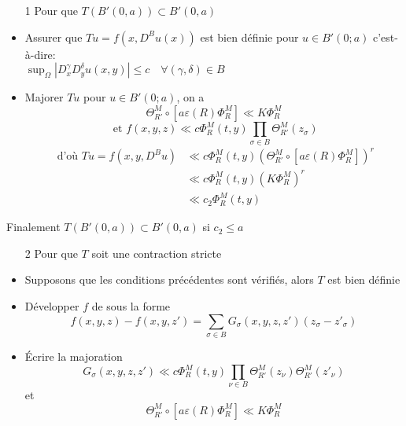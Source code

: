 \documentclass{beamer}
\begin{document}
\begin{frame}
\begin{itemize}
 \item[1] Pour que $T(B'(0,a)) \subset B'(0,a) $
  \end{itemize}

 \begin{itemize}
 \item Assurer que $Tu = f(x, D^B u(x))$ est bien définie pour $u \in B'(0;a)$ c'est-à-dire:\\
 $\sup_\Omega|D^\gamma_xD^\delta_y u(x,y)| \leq c \quad \forall (\gamma, \delta) \in B$
 
 
 \item Majorer $Tu$ pour $u \in B'(0;a)$, on a 
 $$\Theta^M_{R'}\circ[a\varepsilon(R) \Phi^M_R] \ll K \Phi^M_R$$
  $$\text{ et } f(x,y,z) \ll c \Phi^M_R(t,y) \prod_{\sigma \in B} \Theta^M_{R'}(z_\sigma)$$
 \begin{align*}
 \text{ d'où  }Tu=f(x,y,D^Bu) & \ll c \Phi^M_R(t,y) \left( \Theta^M_{R'}\circ[a\varepsilon(R) \Phi^M_R] \right)^r \\
  & \ll c \Phi^M_R(t,y) \left(  K \Phi^M_R \right)^r \\
   & \ll c_2 \Phi^M_R(t,y)
\end{align*}  
 
 \end{itemize}
\end{frame}

\begin{frame}
Finalement $T(B'(0,a)) \subset B'(0,a) $ si $c_2 \leq a$ 
\begin{itemize}
\item[2] Pour que $T$ soit une contraction stricte
\end{itemize}

\begin{itemize}
\item Supposons que les conditions précédentes sont vérifiés, alors
$T$ est bien définie
\item Développer $f$ de sous la forme 
 $$f(x,y,z)-f(x,y,z')= \sum_{\sigma \in B} G_\sigma (x,y,z,z') (z_\sigma - z'_\sigma)$$
 \item Écrire la majoration
 $$ G_\sigma(x,y,z,z') \ll c\Phi^M_R(t,y) \prod_{\nu \in B} \Theta^M_{R'}(z_\nu) \Theta^M_{R'}(z'_\nu) $$  et  $$\Theta^M_{R'}\circ[a\varepsilon(R) \Phi^M_R] \ll K \Phi^M_R$$
\end{itemize}
\end{frame}
\end{document}
